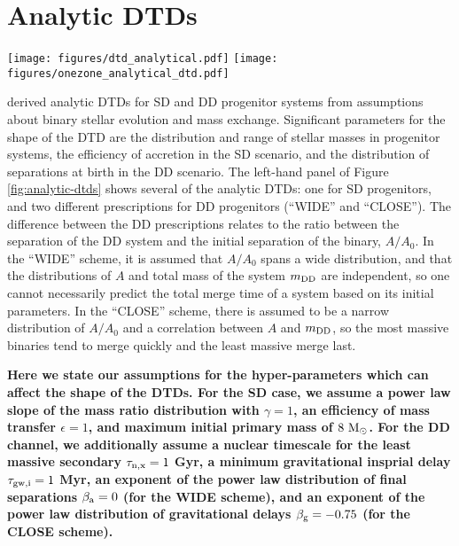 \documentclass[twocolumn,twocolappendix,linenumbers]{aastex631}
\begin{document}
\section{Analytic DTDs}
\label{app:analytic-dtds}

\begin{figure*}
    \centering
    \texttt{[image: figures/dtd\_analytical.pdf]}
    \texttt{[image: figures/onezone\_analytical\_dtd.pdf]}
    \caption{\textit{Left:} Analytic DTDs from \citet[][solid curves]{Greggio2005-AnalyticalRates} and simplified approximations thereof (dashed curves; see Section \ref{sec:dtd-models}). Some functions are presented with a constant multiplicative factor for visual clarity. \textit{Right:} Abundance tracks and distributions from one-zone models with the analytic and simple DTDs (same color scheme). For visual clarity, we vary the mass-loading factor to be $\eta=4$, $\eta=2$, and $\eta=1$ for the red, green, and blue curves, respectively. All other model parameters are identical.}
    \label{fig:analytic-dtds}
\end{figure*}

\citet{Greggio2005-AnalyticalRates} derived analytic DTDs for SD and DD progenitor systems from assumptions about binary stellar evolution and mass exchange. Significant parameters for the shape of the DTD are the distribution and range of stellar masses in progenitor systems, the efficiency of accretion in the SD scenario, and the distribution of separations at birth in the DD scenario. The left-hand panel of Figure \ref{fig:analytic-dtds} shows several of the \citet{Greggio2005-AnalyticalRates} analytic DTDs: one for SD progenitors, and two different prescriptions for DD progenitors (``WIDE'' and ``CLOSE''). The difference between the DD prescriptions relates to the ratio between the separation of the DD system and the initial separation of the binary, $A/A_0$. In the ``WIDE'' scheme, it is assumed that $A/A_0$ spans a wide distribution, and that the distributions of $A$ and total mass of the system $m_{\rm DD}$ are independent, so one cannot necessarily predict the total merge time of a system based on its initial parameters. In the ``CLOSE'' scheme, there is assumed to be a narrow distribution of $A/A_0$ and a correlation between $A$ and $m_{\rm DD}$, so the most massive binaries tend to merge quickly and the least massive merge last.

{\bf Here we state our assumptions for the hyper-parameters which can affect the shape of the \citet{Greggio2005-AnalyticalRates} DTDs. For the SD case, we assume a power law slope of the mass ratio distribution with $\gamma=1$, an efficiency of mass transfer $\epsilon=1$, and maximum initial primary mass of $8~{\rm M}_\odot$. For the DD channel, we additionally assume a nuclear timescale for the least massive secondary $\tau_{\rm n,x}=1$ Gyr, a minimum gravitational insprial delay $\tau_{\rm gw,i}=1$ Myr, an exponent of the power law distribution of final separations $\beta_{\rm a}=0$ (for the WIDE scheme), and an exponent of the power law distribution of gravitational delays $\beta_{\rm g}=-0.75$ (for the CLOSE scheme).}
\end{document}

